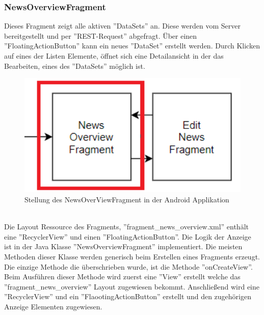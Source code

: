 \subsubsection{NewsOverviewFragment}
Dieses Fragment zeigt alle aktiven ''DataSets'' an. Diese werden vom Server bereitgestellt und per ''REST-Request'' abgefragt. Über einen ''FloatingActionButton'' kann ein neues ''DataSet'' erstellt werden. Durch Klicken auf eines der Listen Elemente, öffnet sich eine Detailansicht in der das Bearbeiten, eines des ''DataSets'' möglich ist.
\\
\begin{figure}[H]
\centering
\includegraphics[width=1.0\textwidth]{images/06_AndroidApp/06_NewsOverviewStellung}
\caption{Stellung des NewsOverViewFragment in der Android Applikation}
\label{fig:mediaNav}
\end{figure}
\\
Die Layout Ressource des Fragments, ''fragment\_news\_overview.xml'' enthält eine ''RecyclerView'' und einen ''FloatingActionButton''. Die Logik der Anzeige ist in der Java Klasse ''NewsOverviewFragment'' implementiert. Die meisten Methoden dieser Klasse werden generisch beim Erstellen eines Fragments erzeugt. Die einzige Methode die überschrieben wurde, ist die Methode ''onCreateView''. Beim Ausführen dieser Methode wird zuerst eine ''View'' erstellt welche das ''fragment\_news\_overview'' Layout zugewiesen bekommt. Anschließend wird eine ''RecyclerView'' und ein ''FlaootingActionButton'' erstellt und den zugehörigen Anzeige Elementen zugewiesen.
